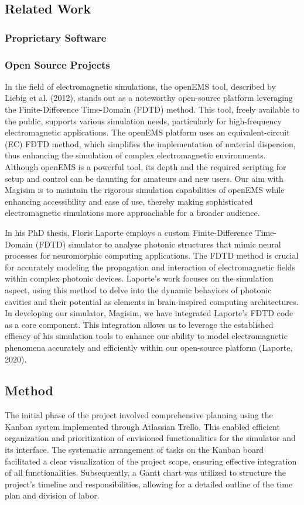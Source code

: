 \documentclass[11pt, a4paper, titlepage]{article}
\begin{document}
\subsection{Related Work}
\subsubsection{Proprietary Software}



\subsubsection{Open Source Projects}
In the field of electromagnetic simulations, the openEMS tool, described by Liebig et al. (2012), stands out as a noteworthy open-source platform leveraging the Finite-Difference Time-Domain (FDTD) method. This tool, freely available to the public, supports various simulation needs, particularly for high-frequency electromagnetic applications. The openEMS platform uses an equivalent-circuit (EC) FDTD method, which simplifies the implementation of material dispersion, thus enhancing the simulation of complex electromagnetic environments. Although openEMS is a powerful tool, its depth and the required scripting for setup and control can be daunting for amateurs and new users. Our aim with Magisim is to maintain the rigorous simulation capabilities of openEMS while enhancing accessibility and ease of use, thereby making sophisticated electromagnetic simulations more approachable for a broader audience.

In his PhD thesis, Floris Laporte employs a custom Finite-Difference Time-Domain (FDTD) simulator to analyze photonic structures that mimic neural processes for neuromorphic computing applications. The FDTD method is crucial for accurately modeling the propagation and interaction of electromagnetic fields within complex photonic devices. Laporte's work focuses on the simulation aspect, using this method to delve into the dynamic behaviors of photonic cavities and their potential as elements in brain-inspired computing architectures. In developing our simulator, Magisim, we have integrated Laporte's FDTD code as a core component. This integration allows us to leverage the established efficacy of his simulation tools to enhance our ability to model electromagnetic phenomena accurately and efficiently within our open-source platform (Laporte, 2020).

\newpage
\subsection{Method}
The initial phase of the project involved comprehensive planning using the Kanban system implemented through Atlassian Trello. This enabled efficient organization and prioritization of envisioned functionalities for the simulator and its interface. The systematic arrangement of tasks on the Kanban board facilitated a clear visualization of the project scope, ensuring effective integration of all functionalities. Subsequently, a Gantt chart was utilized to structure the project's timeline and responsibilities, allowing for a detailed outline of the time plan and division of labor.
\end{document}
